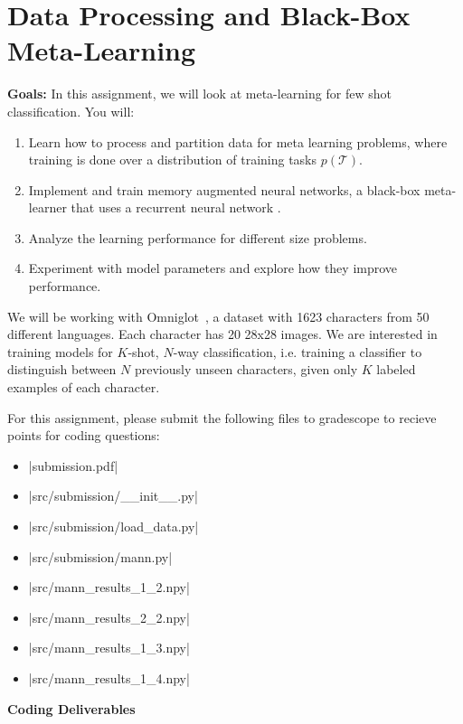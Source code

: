 \section*{Data Processing and Black-Box Meta-Learning}

\textbf{Goals:} In this assignment, we will look at meta-learning for few shot classification. You will:
\begin{enumerate}
    \item Learn how to process and partition data for meta learning problems, where training is done over a distribution of training tasks $p(\mathcal{T})$.
    \item Implement and train memory augmented neural networks, a black-box meta-learner that uses a recurrent neural network \cite{pmlr-v48-santoro16}.
    \item Analyze the learning performance for different size problems.
    \item Experiment with model parameters and explore how they improve performance.
\end{enumerate}

We will be working with Omniglot~\cite{Lake1332}, a dataset with 1623 characters from 50 different languages. Each character has 20 28x28 images.
We are interested in training models for $K$-shot, $N$-way classification, i.e. training a classifier to distinguish between $N$ previously unseen characters, given only $K$ labeled examples of each character.

For this assignment, please submit the following files to gradescope to recieve points for coding questions:
\begin{itemize}
    \item |submission.pdf|
    \item |src/submission/__init__.py|
    \item |src/submission/load_data.py|
    \item |src/submission/mann.py|
    \item |src/mann_results_1_2.npy|
    \item |src/mann_results_2_2.npy|
    \item |src/mann_results_1_3.npy|
    \item |src/mann_results_1_4.npy|
\end{itemize}

\clearpage

\begin{enumerate}
	
    
    
    
\end{enumerate}

\textbf{Coding Deliverables}

\clearpage